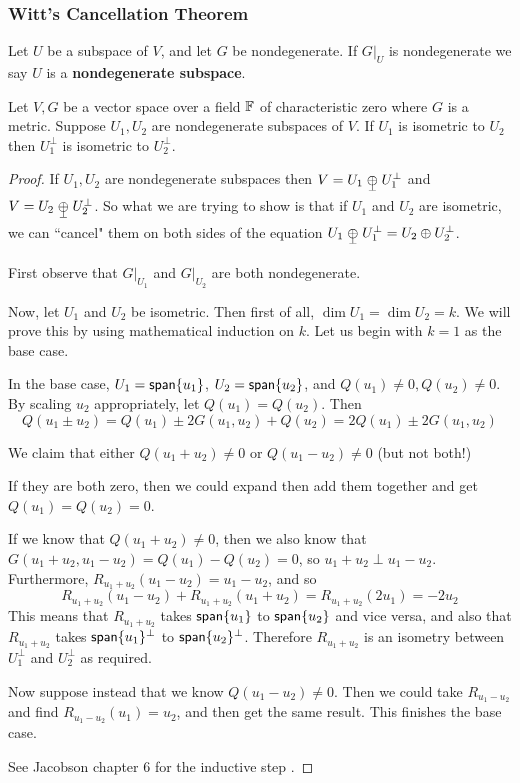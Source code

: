 \subsubsection{Witt's Cancellation Theorem}
\begin{defn}
   Let $U$ be a subspace of $V$, and let $G$ be nondegenerate. If $G|_U$ is nondegenerate we say $U$ is a \textbf{nondegenerate subspace}.
\end{defn}
\begin{thm}
Let $V,G$ be a vector space over a field $\operatorname{\mathbb{F}}$ of characteristic zero where $G$ is a metric. Suppose $U_1,U_2$ are nondegenerate subspaces of $V$. If $U_1$ is isometric to $U_2$ then $U_1^\perp$ is isometric to $U_2^\perp$.\label{thm:wittcancel}
\end{thm}
\begin{proof}
    If $U_1,U_2$ are nondegenerate subspaces then $V = U_1\orthoplus U_1^\perp$ and $V=U_2\orthoplus U_2^\perp$. So what we are trying to show is that if $U_1$ and $U_2$ are isometric, we can ``cancel" them on both sides of the equation $U_1\orthoplus U_1^\perp = U_2\oplus U_2^\perp$.

    First observe that $G|_{U_1}$ and $G|_{U_2}$ are both nondegenerate.

    Now, let $U_1$ and $U_2$ be isometric. Then first of all, $\dim U_1 = \dim U_2 = k$. We will prove this by using mathematical induction on $k$. Let us begin with $k=1$ as the base case.

    In the base case, $U_1 = \operatorname{\textsf{span}}\{u_1\}$, $U_2=\operatorname{\textsf{span}}\{u_2\}$, and $Q(u_1)\neq 0, Q(u_2)\neq 0$. By scaling $u_2$ appropriately, let $Q(u_1)=Q(u_2)$. Then \[Q(u_1\pm u_2) = Q(u_1)\pm 2G(u_1,u_2)+Q(u_2) = 2Q(u_1)\pm 2G(u_1,u_2)\]
    
    We claim that either $Q(u_1+u_2)\neq 0$ or $Q(u_1-u_2)\neq 0$ (but not both!)

    If they are both zero, then we could expand then add them together and get $Q(u_1)=Q(u_2)=0$.

    If we know that $Q(u_1+u_2)\neq 0$, then we also know that $G(u_1+u_2,u_1-u_2) = Q(u_1)-Q(u_2)=0$, so $u_1+u_2\perp u_1-u_2$. Furthermore, $R_{u_1+u_2} (u_1-u_2)=u_1-u_2$, and so \[R_{u_1+u_2}(u_1-u_2)+R_{u_1+u_2}(u_1+u_2) = R_{u_1+u_2}(2u_1) = -2u_2\] This means that $R_{u_1+u_2}$ takes $\operatorname{\textsf{span}}\{u_1\}$ to $\operatorname{\textsf{span}}\{u_2\}$ and vice versa, and also that $R_{u_1+u_2}$ takes $\operatorname{\textsf{span}} \{u_1\}^\perp$ to $\operatorname{\textsf{span}}\{u_2\}^\perp$. Therefore $R_{u_1+u_2}$ is an isometry between $U_1^\perp$ and $U_2^\perp$ as required.

    Now suppose instead that we know $Q(u_1-u_2)\neq 0$. Then we could take $R_{u_1-u_2}$ and find $R_{u_1-u_2}(u_1)=u_2$, and then get the same result. This finishes the base case.

    See Jacobson chapter 6 for the inductive step \cite{Jacobson2009-pp}. 
\end{proof}
